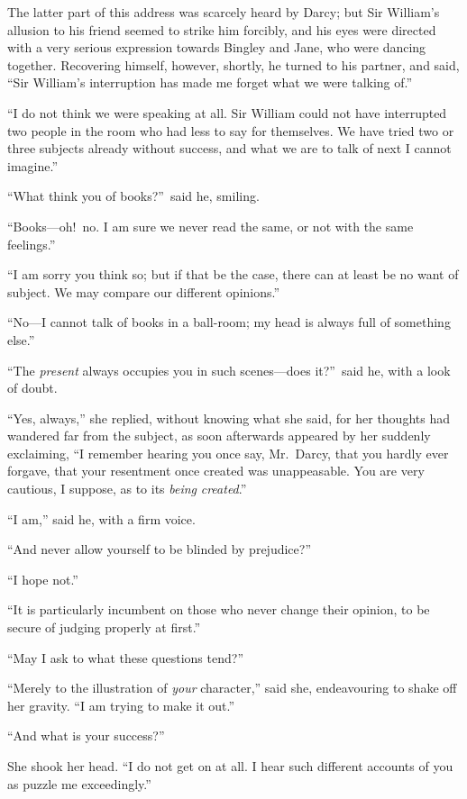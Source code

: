 \documentclass[12pt,english,oneside]{book}
\begin{document}
The latter part of this address was scarcely heard by Darcy; but Sir
William's allusion to his friend seemed to strike him forcibly, and
his eyes were directed with a very serious expression towards Bingley
and Jane, who were dancing together. Recovering himself, however,
shortly, he turned to his partner, and said, {}``Sir William's interruption
has made me forget what we were talking of.''

{}``I do not think we were speaking at all. Sir William could not
have interrupted two people in the room who had less to say for themselves.
We have tried two or three subjects already without success, and what
we are to talk of next I cannot imagine.''

{}``What think you of books?''\ said he, smiling.

{}``Books\mbox{---}oh!\ no. I am sure we never read the same, or
not with the same feelings.''

{}``I am sorry you think so; but if that be the case, there can at
least be no want of subject. We may compare our different opinions.''

{}``No\mbox{---}I cannot talk of books in a ball-room; my head is
always full of something else.''

{}``The \textit{present} always occupies you in such scenes\mbox{---}does
it?''\ said he, with a look of doubt.

{}``Yes, always,'' she replied, without knowing what she said, for
her thoughts had wandered far from the subject, as soon afterwards
appeared by her suddenly exclaiming, {}``I remember hearing you once
say, Mr.\ Darcy, that you hardly ever forgave, that your resentment
once created was unappeasable. You are very cautious, I suppose, as
to its \textit{being} \textit{created}.''

{}``I am,'' said he, with a firm voice.

{}``And never allow yourself to be blinded by prejudice?''

{}``I hope not.''

{}``It is particularly incumbent on those who never change their
opinion, to be secure of judging properly at first.''

{}``May I ask to what these questions tend?''

{}``Merely to the illustration of \textit{your} character,'' said
she, endeavouring to shake off her gravity. {}``I am trying to make
it out.''

{}``And what is your success?''\ 

She shook her head. {}``I do not get on at all. I hear such different
accounts of you as puzzle me exceedingly.''
\end{document}

